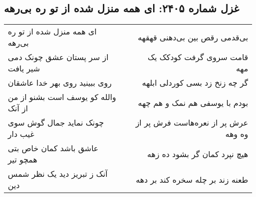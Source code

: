 \begin{center}
\section*{غزل شماره ۲۴۰۵: ای همه منزل شده از تو ره بی‌رهه}
\label{sec:2405}
\begin{longtable}{l p{0.5cm} r}
ای همه منزل شده از تو ره بی‌رهه
&&
بی‌قدمی رقص بین بی‌دهنی قهقهه
\\
از سر پستان عشق چونک دمی شیر یافت
&&
قامت سروی گرفت کودکک یک مهه
\\
روی ببینید روی بهر خدا عاشقان
&&
گر چه زنخ زد بسی کوردلی ابلهه
\\
والله کو یوسف است بشنو از من از آنک
&&
بودم با یوسفی هم نمک و هم چهه
\\
چونک نماید جمال گوش سوی غیب دار
&&
عرش پر از نعره‌هاست فرش پر از وه وهه
\\
عاشق باشد کمان خاص بتی همچو تیر
&&
هیچ نپرد کمان گر بشود ده زهه
\\
آنک ز تبریز دید یک نظر شمس دین
&&
طعنه زند بر چله سخره کند بر دهه
\\
\end{longtable}
\end{center}
